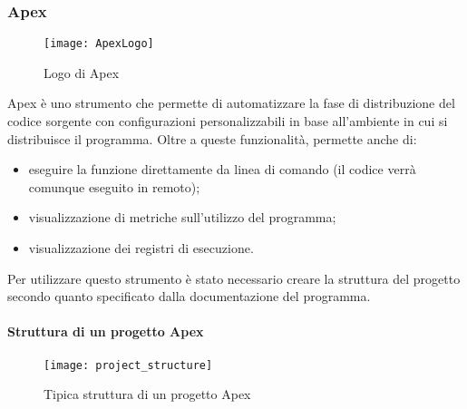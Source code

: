 \subsubsection{Apex}
\begin{figure}[H]
  \centering
  \texttt{[image: ApexLogo]}
  \caption{Logo di Apex}
\end{figure}

Apex è uno strumento che permette di automatizzare la fase di distribuzione del
codice sorgente con configurazioni personalizzabili in base all'ambiente in cui
si distribuisce il programma. Oltre a queste funzionalità, permette anche di:
\begin{itemize}
  \item eseguire la funzione direttamente da linea di comando (il codice verrà
comunque eseguito in remoto);
  \item visualizzazione di metriche sull'utilizzo del programma;
  \item visualizzazione dei registri di esecuzione.
\end{itemize}

Per utilizzare questo strumento è stato necessario creare la struttura del
progetto secondo quanto specificato dalla documentazione del programma.

\paragraph*{Struttura di un progetto Apex}

\begin{figure}[H]
  \centering
  \texttt{[image: project\_structure]}
  \caption{Tipica struttura di un progetto Apex}
\end{figure}

